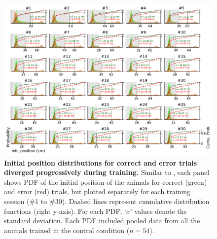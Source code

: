 \begin{figure}[!h]
  \begin{center}
    \includegraphics[width=\textwidth]{ch-appendicies/figures/InitPos.pdf}
    \caption[Initial Position Evolution]
    {\textbf{Initial position distributions for correct and error trials diverged progressively during training.}
    Similar to , each panel shows PDF of the initial position of the animals for correct (green) and error (red) trials, but plotted separately for each training session (\#1 to \#30).
    Dashed lines represent cumulative distribution functions (right y-axis).
    For each PDF, `$\sigma$' values denote the standard deviation.
    Each PDF included pooled data from all the animals trained in the control condition ($n=54$).
    }
    \label{fig:appendix:initPos}
  \end{center}
\end{figure}